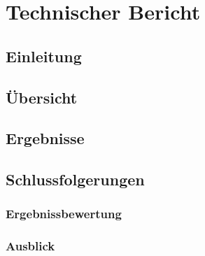 \newcommand*{\TechBerichtPath}{./tex/techn_bericht}%


\section{Technischer Bericht}

\subsection{Einleitung}
\subsection{Übersicht}




\subsection{Ergebnisse}

\subsection{Schlussfolgerungen}
\subsubsection{Ergebnissbewertung}
\subsubsection{Ausblick}